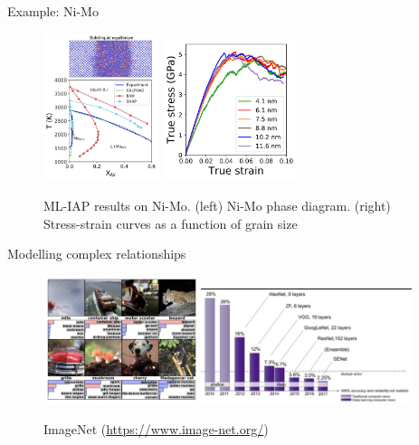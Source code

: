 \documentclass[aspectratio=169]{beamer}
\begin{document}
    \begin{frame}{Example: Ni-Mo}
        \begin{figure}
            \centering
            \includegraphics[width=0.3\textwidth]{figures/ni-mo_pd.png}
            \includegraphics[width=0.35\textwidth]{figures/ni-mo-stress-strain.png}
            \caption{ML-IAP results on Ni-Mo. (left) Ni-Mo phase diagram. (right) Stress-strain curves as a function of grain size\cite{zuoPerformanceCostAssessment2020}}
        \end{figure}
    \end{frame}


    \begin{frame}{Modelling complex relationships}
        \begin{figure}
            \centering
            \includegraphics[width=0.4\textwidth]{figures/imagenet.png}
            \includegraphics[width=0.55\textwidth]{figures/imagenetperf.png}
            \caption{ImageNet (\url{https://www.image-net.org/})}
        \end{figure}
    \end{frame}
\end{document}
